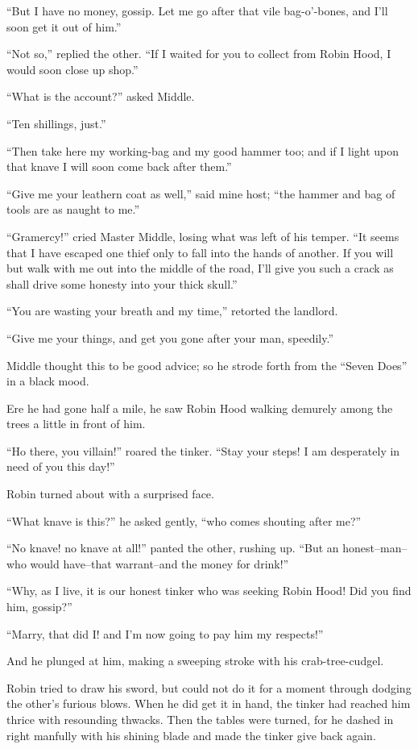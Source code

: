 ``But I have no money, gossip. Let me go after that vile bag-o'-bones,
and I'll soon get it out of him.''

``Not so,'' replied the other. ``If I waited for you to collect from
Robin Hood, I would soon close up shop.''

``What is the account?'' asked Middle.

``Ten shillings, just.''

``Then take here my working-bag and my good hammer too; and if I light
upon that knave I will soon come back after them.''

``Give me your leathern coat as well,'' said mine host; ``the hammer and
bag of tools are as naught to me.''

``Gramercy!'' cried Master Middle, losing what was left of his temper.
``It seems that I have escaped one thief only to fall into the hands of
another. If you will but walk with me out into the middle of the road,
I'll give you such a crack as shall drive some honesty into your thick
skull.''

``You are wasting your breath and my time,'' retorted the landlord.

``Give me your things, and get you gone after your man, speedily.''

Middle thought this to be good advice; so he strode forth from the
``Seven Does'' in a black mood.

Ere he had gone half a mile, he saw Robin Hood walking demurely among
the trees a little in front of him.

``Ho there, you villain!'' roared the tinker. ``Stay your steps! I am
desperately in need of you this day!''

Robin turned about with a surprised face.

``What knave is this?'' he asked gently, ``who comes shouting after
me?''

``No knave! no knave at all!'' panted the other, rushing up. ``But an
honest--man--who would have--that warrant--and the money for drink!''

``Why, as I live, it is our honest tinker who was seeking Robin Hood!
Did you find him, gossip?''

``Marry, that did I! and I'm now going to pay him my respects!''

And he plunged at him, making a sweeping stroke with his
crab-tree-cudgel.

Robin tried to draw his sword, but could not do it for a moment through
dodging the other's furious blows. When he did get it in hand, the
tinker had reached him thrice with resounding thwacks. Then the tables
were turned, for he dashed in right manfully with his shining blade and
made the tinker give back again.

